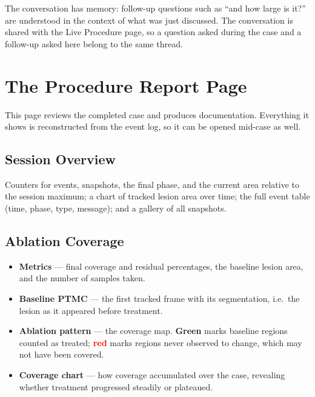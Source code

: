\documentclass[11pt,a4paper]{article}
\begin{document}
The conversation has memory: follow-up questions such as ``and how large is
it?'' are understood in the context of what was just discussed. The
conversation is shared with the Live Procedure page, so a question asked
during the case and a follow-up asked here belong to the same thread.

\section{The Procedure Report Page}

This page reviews the completed case and produces documentation. Everything it
shows is reconstructed from the event log, so it can be opened mid-case as
well.

\subsection{Session Overview}

Counters for events, snapshots, the final phase, and the current area relative
to the session maximum; a chart of tracked lesion area over time; the full
event table (time, phase, type, message); and a gallery of all snapshots.

\subsection{Ablation Coverage}

\begin{itemize}[leftmargin=1.4em]
  \item \textbf{Metrics} --- final coverage and residual percentages, the
  baseline lesion area, and the number of samples taken.
  \item \textbf{Baseline PTMC} --- the first tracked frame with its
  segmentation, i.e.\ the lesion as it appeared before treatment.
  \item \textbf{Ablation pattern} --- the coverage map. \textcolor{tipline}
  {\textbf{Green}} marks baseline regions counted as treated;
  \textcolor{red}{\textbf{red}} marks regions never observed to change, which
  may not have been covered.
  \item \textbf{Coverage chart} --- how coverage accumulated over the case,
  revealing whether treatment progressed steadily or plateaued.
\end{itemize}
\end{document}
